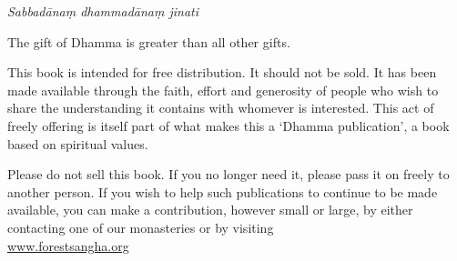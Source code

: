 

\begin{quotepage}{0.9\linewidth}
\smaller\centering\setlength{\parskip}{1em}

\textit{Sabbad\=ana\d{m} dhammad\=ana\d{m} jinati}\\
\vspace*{0.25\baselineskip}

The gift of Dhamma is greater than all other gifts.
\bigskip

\label{dont-sell}
This book is intended for free distribution. It should not be sold. It has been made available through the faith, effort and generosity of people who wish to share the understanding it contains with whomever is interested. This act of freely offering is itself part of what makes this a `Dhamma publication', a book based on spiritual values.

Please do not sell this book. If you no longer need it, please pass it on freely to another person. If you wish to help such publications to continue to be made available, you can make a contribution, however small or large, by either contacting one of our monasteries or by visiting\\ \href{http://forestsangha.org}{www.forestsangha.org}

\end{quotepage}

